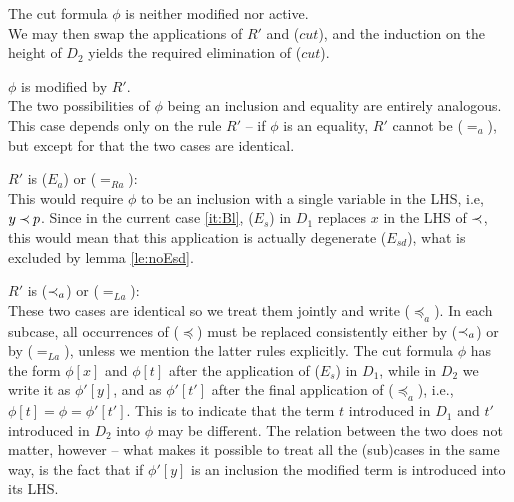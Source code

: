 \begin{PROOF}
\begin{LS}
\begin{LSA}
%
\item\label{it:cutneither} The cut formula $\phi$ is neither modified nor active.\\
We may then swap the
applications of $R'$ and ($cut$), and the induction on the height of $D_2$
yields the required elimination of ($cut$). 
%
\item\label{it:cutmodified}  $\phi$ is modified by $R'$.\\
The two possibilities of $\phi$ being an inclusion and equality are entirely 
analogous. This case depends only on the rule $R'$ -- if $\phi$ is an equality, 
$R'$ cannot be ($=_a$), but except for that the two cases are identical.
%
 \begin{LSB}
   \item $R'$ is ($E_a$) or ($=_{Ra}$): \\
  This would require $\phi$ to be an inclusion with  a single
   variable in the LHS, i.e, $y\mathbin{\prec} p$. %
Since in the current case \ref{it:Bl},
  ($E_s$) in $D_1$
   replaces $x$ in the LHS of $\mathbin{\prec}$, this would mean that this application is
   actually degenerate ($E_{sd}$), what is excluded by lemma \ref{le:noEsd}. 
  \item  $R'$ is ($\mathbin{\prec}_a$) or ($=_{La}$): \\
  \noindent
   These two cases are identical so we treat them jointly and
  write ($\preceq_a$). In each subcase, all occurrences of ($\preceq$) must be
  replaced consistently either by ($\mathbin{\prec}_a$) or by ($=_{La}$), unless we
  mention the latter rules explicitly. The cut formula $\phi$ 
has the form $\phi[x]$ and $\phi[t]$ after the application of ($E_s$) in $D_1$, while in $D_2$ we 
write it as $\phi'[y]$, and as $\phi'[t']$ after the final application of ($\preceq_a$), i.e., 
 $\phi[t] = \phi = \phi'[t']$. This is to indicate that the term $t$ introduced in $D_1$ and
$t'$ introduced in $D_2$ into $\phi$ may be different. The relation between the two
 does not matter, however -- what makes it possible to treat all the (sub)cases in
the same way, is the fact that if $\phi'[y]$ is an inclusion the modified term is introduced into
its LHS.


\end{LSB}
\end{LSA}
\end{LS}
\end{PROOF}
